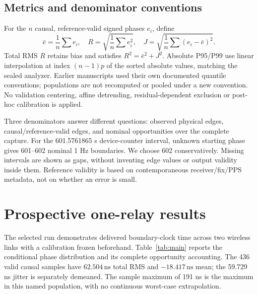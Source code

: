 \documentclass[11pt,letterpaper]{article}
\newcommand{\ns}{\,\mathrm{ns}}\newcommand{\us}{\,\mu\mathrm{s}}\newcommand{\ms}{\,\mathrm{ms}}\newcommand{\ppb}{\,\mathrm{ppb}}\newcommand{\code}[1]{\texttt{#1}}\newcolumntype{L}[1]{>{\RaggedRight\arraybackslash}p{#1}}
\begin{document}
\subsection{Metrics and denominator conventions}
For the $n$ causal, reference-valid signed phases $e_i$, define
\begin{equation}
 \bar e=\frac{1}{n}\sum e_i,\quad R=\sqrt{\frac{1}{n}\sum e_i^2},\quad
 J=\sqrt{\frac{1}{n}\sum(e_i-\bar e)^2}.\label{eq:metrics}
\end{equation}
Total RMS $R$ retains bias and satisfies $R^2=\bar e^2+J^2$. Absolute P95/P99 use linear interpolation at index $(n-1)p$ of the sorted absolute values, matching the sealed analyzer. Earlier manuscripts used their own documented quantile conventions; populations are not recomputed or pooled under a new convention. No validation centering, affine detrending, residual-dependent exclusion or post-hoc calibration is applied.

Three denominators answer different questions: observed physical edges, causal/reference-valid edges, and nominal opportunities over the complete capture. For the 601.5761865 s device-counter interval, unknown starting phase gives 601--602 nominal 1 Hz boundaries. We choose 602 conservatively. Missing intervals are shown as gaps, without inventing edge values or output validity inside them. Reference validity is based on contemporaneous receiver/fix/PPS metadata, not on whether an error is small.

\section{Prospective one-relay results}\label{sec:results}
The selected run demonstrates delivered boundary-clock time across two wireless links with a calibration frozen beforehand. Table~\ref{tab:main} reports the conditional phase distribution and its complete opportunity accounting. The 436 valid causal samples have $62.504\ns$ total RMS and $-18.417\ns$ mean; the 59.729 ns jitter is separately demeaned. The sample maximum of 191 ns is the maximum in this named population, with no continuous worst-case extrapolation.
\end{document}
